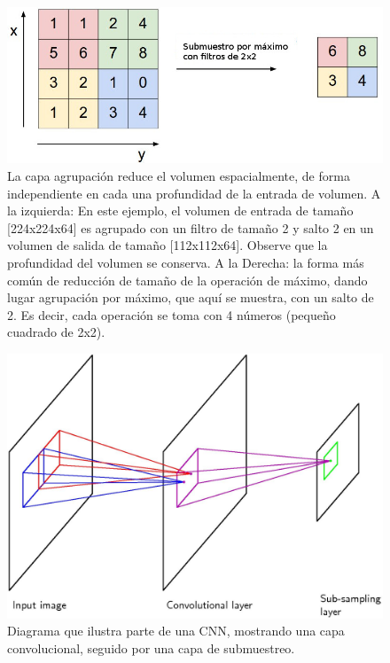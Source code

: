 \documentclass[a4paper,11pt,spanish]{book}
\begin{document}
      \begin{figure}[H]
	\begin{center}
	  \includegraphics[width=0.8\linewidth]{./img/stanford_maxpool_spanish.jpeg}
	\end{center}
	\caption{La capa agrupación reduce el volumen espacialmente, de forma independiente en cada una profundidad de la entrada de volumen.
	  A la izquierda: En este ejemplo, el volumen de entrada de tamaño [224x224x64] es agrupado con un filtro de tamaño 2 y salto 2 en un volumen de salida de tamaño [112x112x64].
	  Observe que la profundidad del volumen se conserva. A la Derecha: la forma más común de reducción de tamaño de la operación de máximo, dando lugar agrupación por máximo,
	  que aquí se muestra, con un salto de 2. Es decir, cada operación se toma con 4 números (pequeño cuadrado de 2x2). \cite{Karpathy:Stanford}}
	\label{fig:maxpool_layer}
      \end{figure}
    
      \begin{figure}[h]
	\begin{center}
	\includegraphics[width=0.8\linewidth]{./img/bishop_cnn.jpg}
	\end{center}
	\caption{Diagrama que ilustra parte de una CNN, mostrando una capa convolucional, seguido por una capa de submuestreo.}
	\label{fig:bishop_cnn}
      \end{figure}
      
\end{document}
